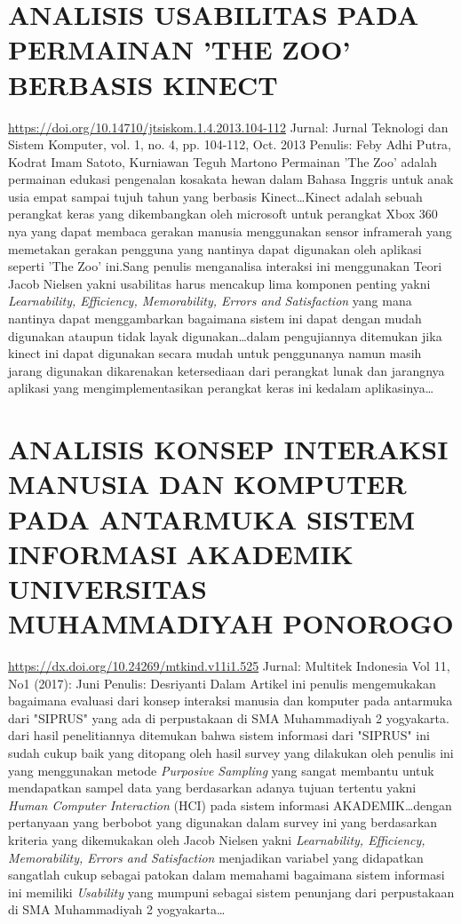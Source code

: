 \documentclass[a4paper, 12pt]{article}
\begin{document}
\section{ANALISIS USABILITAS PADA PERMAINAN 'THE ZOO' BERBASIS KINECT}
\url{https://doi.org/10.14710/jtsiskom.1.4.2013.104-112}\newline
Jurnal: Jurnal Teknologi dan Sistem Komputer, vol. 1, no. 4, pp. 104-112, Oct. 2013\newline
Penulis: Feby Adhi Putra, Kodrat Imam Satoto, Kurniawan Teguh Martono\newline
Permainan 'The Zoo' adalah permainan edukasi pengenalan kosakata hewan dalam Bahasa Inggris untuk anak usia empat sampai tujuh tahun yang berbasis Kinect\dots Kinect adalah sebuah perangkat keras yang dikembangkan oleh microsoft untuk perangkat Xbox 360 nya  yang dapat membaca gerakan manusia menggunakan sensor inframerah yang memetakan gerakan pengguna yang nantinya dapat digunakan oleh aplikasi seperti 'The Zoo' ini.Sang penulis menganalisa interaksi ini menggunakan Teori Jacob Nielsen yakni usabilitas harus mencakup lima komponen penting yakni \emph{Learnability, Efficiency, Memorability, Errors and Satisfaction} yang mana nantinya dapat menggambarkan bagaimana sistem ini dapat dengan mudah digunakan ataupun tidak layak digunakan\dots dalam pengujiannya ditemukan jika kinect ini dapat digunakan secara mudah untuk penggunanya namun masih jarang digunakan dikarenakan ketersediaan dari perangkat lunak dan jarangnya aplikasi yang mengimplementasikan perangkat keras ini kedalam aplikasinya\dots
\section{ANALISIS KONSEP INTERAKSI MANUSIA DAN KOMPUTER
PADA ANTARMUKA SISTEM INFORMASI AKADEMIK
UNIVERSITAS MUHAMMADIYAH PONOROGO}
\url{https://dx.doi.org/10.24269/mtkind.v11i1.525}\newline
Jurnal: Multitek Indonesia Vol 11, No1 (2017): Juni\newline
Penulis: Desriyanti\newline
Dalam Artikel ini penulis mengemukakan bagaimana evaluasi dari konsep interaksi manusia dan komputer pada antarmuka dari "SIPRUS" yang ada di perpustakaan di SMA Muhammadiyah 2 yogyakarta. dari hasil penelitiannya ditemukan bahwa sistem informasi dari "SIPRUS" ini sudah cukup baik yang ditopang oleh hasil survey yang dilakukan oleh penulis ini yang menggunakan metode \emph{Purposive Sampling} yang sangat membantu untuk mendapatkan sampel data yang berdasarkan adanya tujuan tertentu yakni \emph{Human Computer Interaction} (HCI) pada sistem informasi AKADEMIK\dots dengan pertanyaan yang berbobot yang digunakan dalam survey ini yang berdasarkan kriteria yang dikemukakan oleh Jacob Nielsen yakni \emph{Learnability, Efficiency, Memorability, Errors and Satisfaction} menjadikan variabel yang didapatkan sangatlah cukup sebagai patokan dalam memahami bagaimana sistem informasi ini memiliki \emph{Usability} yang mumpuni sebagai sistem penunjang dari perpustakaan di SMA Muhammadiyah 2 yogyakarta\dots
\end{document}
